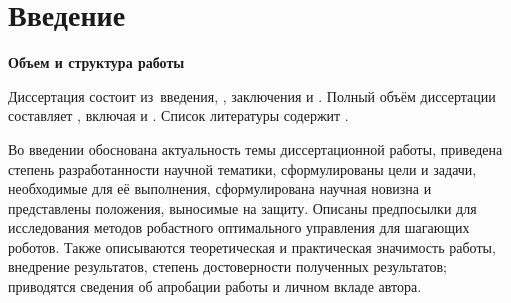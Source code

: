 \chapter*{Введение}                         %

\newcommand{\actuality}{\textbf{\actualityTXT}}
\newcommand{\progress}{\textbf{\progressTXT}}
\newcommand{\objectsubject}{\textbf{\objectsubjectTXT}}
\newcommand{\aimtasks}{\textbf{\aimtasksTXT}}
\newcommand{\methods}{\textbf{\methodsTXT}}
\newcommand{\defpositions}{\textbf{\defpositionsTXT}}
\newcommand{\compliances}{\textbf{\complianceTXT}}
\newcommand{\novelty}{\textbf{\noveltyTXT}}
\newcommand{\probation}{\textbf{\probationTXT}}
\newcommand{\influence}{\textbf{\influenceTXT}}
\newcommand{\reliability}{\textbf{\reliabilityTXT}}
\newcommand{\publications}{\textbf{\publicationsTXT}}
\newcommand{\contribution}{\textbf{\contributionTXT}}


\textbf{Объем и структура работы} 

Диссертация состоит из~введения,
,
заключения и
.
%
Полный объём диссертации составляет
, включая
 и
.
Список литературы содержит
.

Во введении обоснована актуальность темы диссертационной работы, приведена степень разработанности научной тематики,  сформулированы цели и задачи, необходимые для её выполнения, сформулирована научная новизна и представлены положения, выносимые на защиту. Описаны предпосылки для исследования методов робастного оптимального управления для шагающих роботов. Также описываются теоретическая и практическая значимость работы, внедрение результатов, степень достоверности полученных результатов; приводятся сведения об апробации работы и личном вкладе автора. 

